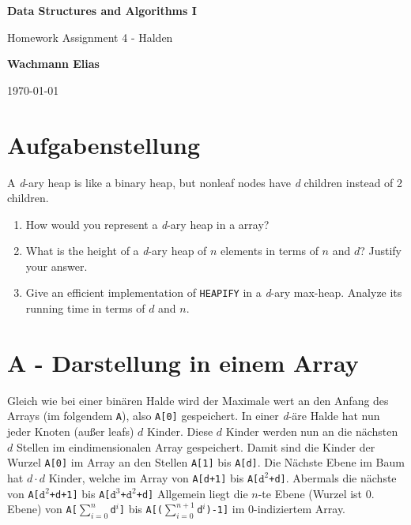 \documentclass[ngerman]{scrartcl}
\newcommand{\code}{\texttt}
\begin{document}
\begin{titlepage}
    \begin{center}
        \vspace{1cm}
        \Huge
        \textbf{Data Structures and Algorithms I}
        \vspace{5mm}

        \Large
        Homework Assignment 4 - Halden
        \vspace{5mm}


        \textbf{Wachmann Elias}


        \today
    \end{center}
\end{titlepage}

\section{Aufgabenstellung}
\label{sec:aufgabenstellung}
A \emph{d}-ary heap is like a binary heap, but nonleaf nodes have \emph{d} children instead of 2 children.
\begin{enumerate}[label=(\Alph*)]
    \item How would you represent a \emph{d}-ary heap in a array?
    \item What is the height of a \emph{d}-ary heap of $n$ elements in terms of $n$ and $d$? Justify your answer.
    \item Give an efficient implementation of \code{HEAPIFY} in a \emph{d}-ary max-heap. Analyze its running time in terms of $d$ and $n$.
\end{enumerate}

\section{A - Darstellung in einem Array}
\label{sec:darstellung}

Gleich wie bei einer binären Halde wird der Maximale wert an den Anfang des Arrays (im folgendem \code{A}), also \code{A[0]} gespeichert. In einer \emph{d}-äre Halde hat nun jeder Knoten (außer leafs) $d$ Kinder. Diese $d$ Kinder werden nun an die nächsten $d$ Stellen im eindimensionalen Array gespeichert. Damit sind die Kinder der Wurzel \code{A[0]} im Array an den Stellen \code{A[1]} bis \code{A[d]}. Die Nächste Ebene im Baum hat $d\cdot d$ Kinder, welche im Array von \code{A[d+1]} bis \code{A[$\code{d}^2$+d]}. Abermals die nächste von \code{A[$\code{d}^2$+d+1]} bis \code{A[$\code{d}^3$+$\code{d}^2$+d]} Allgemein liegt die $n$-te Ebene (Wurzel ist 0. Ebene) von \code{A[$\sum_{i = 0}^{n}$d$^i$]} bis \code{A[($\sum_{i = 0}^{n+1}$d$^i$)-1]} im 0-indiziertem Array.
\end{document}
